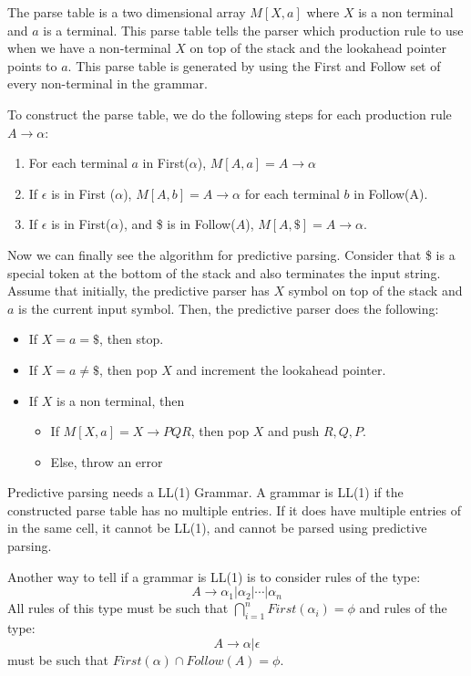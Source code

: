 \documentclass[12pt,letterpaper]{book}
\theoremstyle{definition}
\begin{document}
The parse table is a two dimensional array $M[X,a]$ where $X$ is a non terminal and $a$ is a terminal. This parse table tells the parser which production rule to use when we have a non-terminal $X$ on top of the stack and the lookahead pointer points to $a$. This parse table is generated by using the First and Follow set of every non-terminal in the grammar.

To construct the parse table, we do the following steps for each production rule $A \rightarrow \alpha$:

\begin{enumerate}
  \item For each terminal $a$ in First($\alpha$), $M[A,a] = A \rightarrow \alpha$
  \item If $\epsilon$ is in First ($\alpha$), $M[A,b] = A \rightarrow \alpha$ for each terminal $b$ in Follow(A).
  \item If $\epsilon$ is in First($\alpha$), and \$ is in Follow($A$), $M[A,\$] = A \rightarrow \alpha$.
\end{enumerate}

Now we can finally see the algorithm for predictive parsing. Consider that \$ is a special token at the bottom of the stack and also terminates the input string. Assume that initially, the predictive parser has $X$ symbol on top of the stack and $a$ is the current input symbol. Then, the predictive parser does the following:

\begin{itemize}
  \item If $X=a=\$$, then stop.
  \item If $X = a \neq \$$, then pop $X$ and increment the lookahead pointer.
  \item If $X$ is a non terminal, then
    \begin{itemize}
      \item If $M[X,a] = X \rightarrow PQR$, then pop $X$ and push $R,Q,P$.
      \item Else, throw an error
    \end{itemize}
\end{itemize}

Predictive parsing needs a LL(1) Grammar. A grammar is LL(1) if the constructed parse table has no multiple entries. If it does have multiple entries of in the same cell, it cannot be LL(1), and cannot be parsed using predictive parsing.

Another way to tell if a grammar is LL(1) is to consider rules of the type:
\[A \rightarrow \alpha_1 | \alpha_2 | \cdots | \alpha_n\]
All rules of this type must be such that $\bigcap_{i=1}^n First(\alpha_i) = \phi$ and rules of the type:
\[A \rightarrow \alpha | \epsilon\]
must be such that $First(\alpha) \cap Follow(A) = \phi$.
\end{document}
